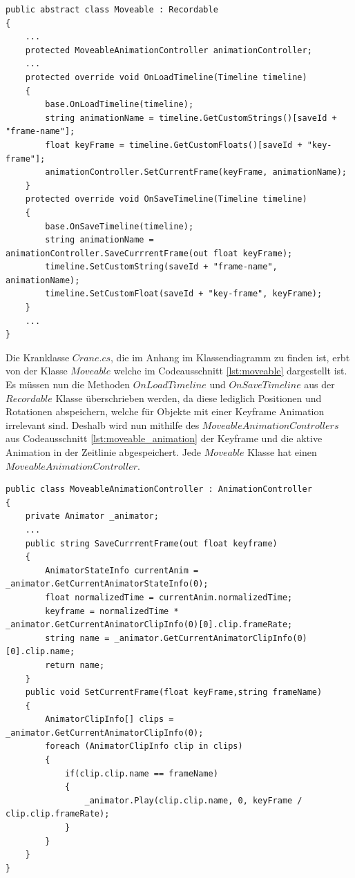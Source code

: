 \begin{lstlisting}[caption={Ausschnitt aus Moveable.cs}, label={lst:moveable}]
public abstract class Moveable : Recordable
{
    ...
    protected MoveableAnimationController animationController;
    ...
    protected override void OnLoadTimeline(Timeline timeline)
    {
        base.OnLoadTimeline(timeline);
        string animationName = timeline.GetCustomStrings()[saveId + "frame-name"];
        float keyFrame = timeline.GetCustomFloats()[saveId + "key-frame"];
        animationController.SetCurrentFrame(keyFrame, animationName);
    }
    protected override void OnSaveTimeline(Timeline timeline)
    {
        base.OnSaveTimeline(timeline);
        string animationName = animationController.SaveCurrrentFrame(out float keyFrame);
        timeline.SetCustomString(saveId + "frame-name", animationName);
        timeline.SetCustomFloat(saveId + "key-frame", keyFrame);
    }
    ...
}
\end{lstlisting}

Die Kranklasse $Crane.cs$, die im Anhang im Klassendiagramm zu finden ist, erbt von der Klasse $Moveable$ welche im Codeausschnitt \ref{lst:moveable} dargestellt ist. Es müssen nun die Methoden $OnLoadTimeline$ und $OnSaveTimeline$ aus der $Recordable$ Klasse überschrieben werden, da diese lediglich Positionen und Rotationen abspeichern, welche für Objekte mit einer Keyframe Animation irrelevant sind. Deshalb wird nun mithilfe des $MoveableAnimationControllers$ aus Codeausschnitt \ref{lst:moveable_animation} der Keyframe und die aktive Animation in der Zeitlinie abgespeichert. Jede $Moveable$ Klasse hat einen $MoveableAnimationController$.

\begin{lstlisting}[caption={Ausschnitt aus MoveableAnimationController.cs}, label={lst:moveable_animation}]
public class MoveableAnimationController : AnimationController
{
    private Animator _animator;
    ...
    public string SaveCurrrentFrame(out float keyframe)
    {
        AnimatorStateInfo currentAnim = _animator.GetCurrentAnimatorStateInfo(0);
        float normalizedTime = currentAnim.normalizedTime;
        keyframe = normalizedTime * _animator.GetCurrentAnimatorClipInfo(0)[0].clip.frameRate;
        string name = _animator.GetCurrentAnimatorClipInfo(0)[0].clip.name;
        return name;
    }
    public void SetCurrentFrame(float keyFrame,string frameName)
    {
        AnimatorClipInfo[] clips = _animator.GetCurrentAnimatorClipInfo(0);
        foreach (AnimatorClipInfo clip in clips)
        {
            if(clip.clip.name == frameName)
            {
                _animator.Play(clip.clip.name, 0, keyFrame / clip.clip.frameRate);
            }
        }
    }
}
\end{lstlisting}

